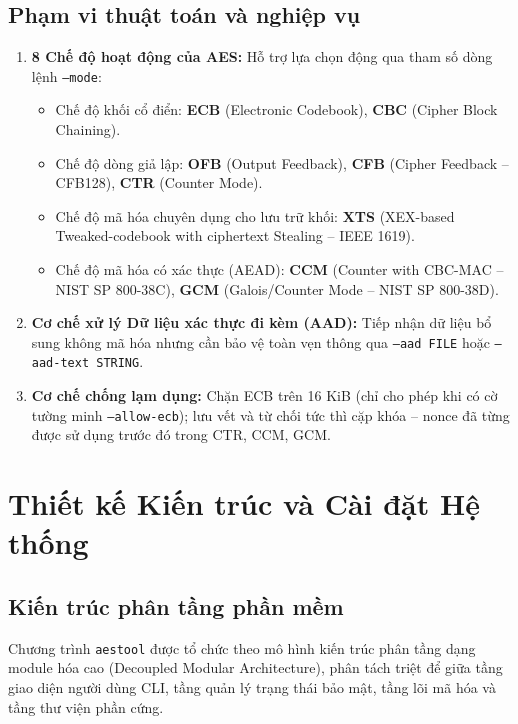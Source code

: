 \documentclass[12pt, a4paper]{report}
\begin{document}
\subsection{Phạm vi thuật toán và nghiệp vụ}
\begin{enumerate}
    \item \textbf{8 Chế độ hoạt động của AES:} Hỗ trợ lựa chọn động qua tham số dòng lệnh \texttt{--mode}:
    \begin{itemize}
        \item Chế độ khối cổ điển: \textbf{ECB} (Electronic Codebook), \textbf{CBC} (Cipher Block Chaining).
        \item Chế độ dòng giả lập: \textbf{OFB} (Output Feedback), \textbf{CFB} (Cipher Feedback -- CFB128), \textbf{CTR} (Counter Mode).
        \item Chế độ mã hóa chuyên dụng cho lưu trữ khối: \textbf{XTS} (XEX-based Tweaked-codebook with ciphertext Stealing -- IEEE 1619).
        \item Chế độ mã hóa có xác thực (AEAD): \textbf{CCM} (Counter with CBC-MAC -- NIST SP 800-38C), \textbf{GCM} (Galois/Counter Mode -- NIST SP 800-38D).
    \end{itemize}
    \item \textbf{Cơ chế xử lý Dữ liệu xác thực đi kèm (AAD):} Tiếp nhận dữ liệu bổ sung không mã hóa nhưng cần bảo vệ toàn vẹn thông qua \texttt{--aad FILE} hoặc \texttt{--aad-text STRING}.
    \item \textbf{Cơ chế chống lạm dụng:} Chặn ECB trên 16 KiB (chỉ cho phép khi có cờ tường minh \texttt{--allow-ecb}); lưu vết và từ chối tức thì cặp khóa -- nonce đã từng được sử dụng trước đó trong CTR, CCM, GCM.
\end{enumerate}

\section{Thiết kế Kiến trúc và Cài đặt Hệ thống}
\label{sec:design}

\subsection{Kiến trúc phân tầng phần mềm}
Chương trình \texttt{aestool} được tổ chức theo mô hình kiến trúc phân tầng dạng module hóa cao (Decoupled Modular Architecture), phân tách triệt để giữa tầng giao diện người dùng CLI, tầng quản lý trạng thái bảo mật, tầng lõi mã hóa và tầng thư viện phần cứng.
\end{document}
